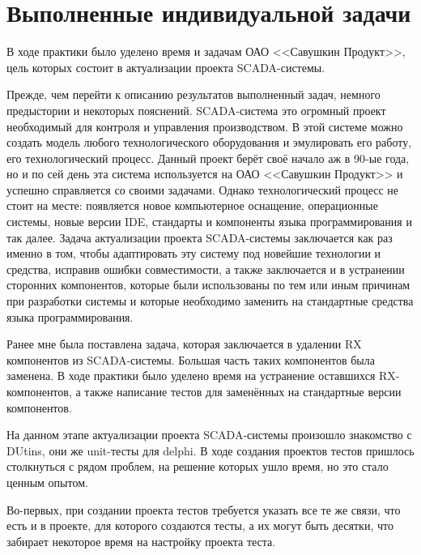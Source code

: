 \sectionbreak \section*{ 
    \gostTitleFont
    \redline
    Выполненные индивидуальной задачи
}

\subtitlespace

{\gostFont

    \par \redline В ходе практики было уделено время и задачам ОАО <<Савушкин Продукт>>, цель которых состоит в актуализации проекта SCADA-системы. 

    \par \redline Прежде, чем перейти к описанию результатов выполненный задач, немного предыстории и некоторых пояснений. SCADA-система это огромный проект необходимый для контроля и управления производством. В этой системе можно создать модель любого технологического оборудования и эмулировать его работу, его технологический процесс. Данный проект берёт своё начало аж в 90-ые года, но и по сей день эта система используется на ОАО <<Савушкин Продукт>> и успешно справляется со своими задачами. Однако технологический процесс не стоит на месте: появляется новое компьютерное оснащение, операционные системы, новые версии IDE, стандарты и компоненты языка программирования и так далее. Задача актуализации проекта SCADA-системы заключается как раз именно в том, чтобы адаптировать эту систему под новейшие технологии и средства, исправив ошибки совместимости, а также заключается и в устранении сторонних компонентов, которые были использованы по тем или иным причинам при разработки системы и которые необходимо заменить на стандартные средства языка программирования.

    \par \redline Ранее мне была поставлена задача, которая заключается в удалении RX компонентов из SCADA-системы. Большая часть таких компонентов была заменена. В ходе практики было уделено время на устранение оставшихся RX-компонентов, а также написание тестов для заменённых на стандартные версии компонентов.

    \par \redline На данном этапе актуализации проекта SCADA-системы произошло знакомство с DUtins, они же unit-тесты для delphi. В ходе создания проектов тестов пришлось столкнуться с рядом проблем, на решение которых ушло время, но это стало ценным опытом.

    \par \redline Во-первых, при создании проекта тестов требуется указать все те же связи, что есть и в проекте, для которого создаются тесты, а их могут быть десятки, что забирает некоторое время на настройку проекта теста. 

}

